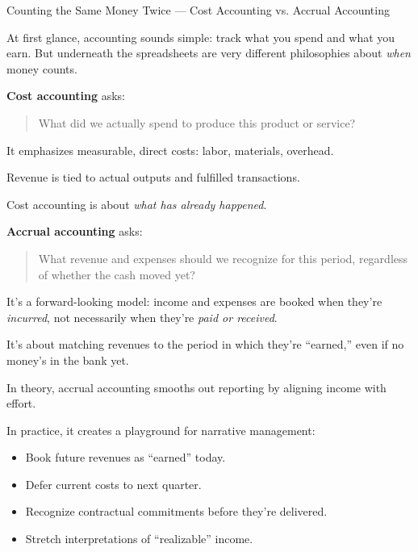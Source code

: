 \medskip

\begin{HistoricalSidebar}{Counting the Same Money Twice — Cost Accounting vs. Accrual Accounting}

At first glance, accounting sounds simple: track what you spend and what you earn.  
But underneath the spreadsheets are very different philosophies about \textit{when} money counts.

\medskip

\textbf{Cost accounting} asks:  

\begin{quote}
What did we actually spend to produce this product or service?
\end{quote}

It emphasizes measurable, direct costs: labor, materials, overhead.  

\medskip

Revenue is tied to actual outputs and fulfilled transactions.  

\medskip

Cost accounting is about \textit{what has already happened}.

\medskip

\textbf{Accrual accounting} asks:  

\begin{quote}
What revenue and expenses should we recognize for this period, regardless of whether the cash moved yet?
\end{quote}

It’s a forward-looking model: income and expenses are booked when they’re \textit{incurred}, not necessarily when they’re \textit{paid or received}.  

\medskip

It’s about matching revenues to the period in which they’re “earned,” even if no money’s in the bank yet.

\medskip

In theory, accrual accounting smooths out reporting by aligning income with effort.  

\medskip

In practice, it creates a playground for narrative management:

\begin{itemize}
    \item Book future revenues as “earned” today.
    \item Defer current costs to next quarter.
    \item Recognize contractual commitments before they’re delivered.
    \item Stretch interpretations of “realizable” income.
\end{itemize}


\end{HistoricalSidebar}
